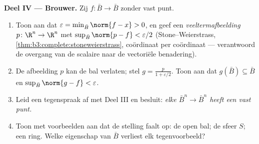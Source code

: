 \begin{problem}
\medskip
\noindent\textbf{Deel IV ---  Brouwer.} Zij
$f\colon\bar B\to\bar B$  zonder vast punt.
\begin{enumerate}[resume]
  \item Toon aan dat $\varepsilon = \min_{\bar B}\norm{f - x} >
        0$, en geef een \emph{veeltermafbeelding} $p\colon\R^n\to
        \R^n$ met $\sup_{\bar B}\norm{p - f} < \varepsilon/2$
        (Stone--Weierstrass,
        \cref{thm:b3:complete:stoneweierstrass}, coördinaat per
        coördinaat --- verantwoord de overgang van de scalaire
        naar de vectoriële benadering).
  \item De afbeelding $p$ kan de bal verlaten; stel $g =
        \frac{p}{1 + \varepsilon/2}$. Toon aan dat $g(\bar B)
        \subseteq \bar B$ en $\sup_{\bar B}\norm{g - f} <
        \varepsilon$.
  \item Leid een tegenspraak af met Deel III en besluit:
        \emph{elke  $\bar B^n \to \bar B^n$
        heeft een vast punt.}
  \item Toon met voorbeelden aan dat de stelling faalt op: de
        open bal; de sfeer $S$; een  ring. Welke
        eigenschap van $\bar B$ verliest elk tegenvoorbeeld?
\end{enumerate}


\end{problem}
